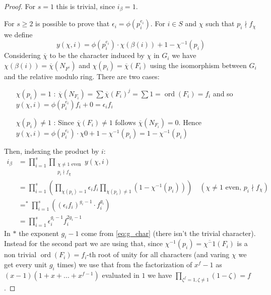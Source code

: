 \documentclass[]{article}
\theoremstyle{plain}
\theoremstyle{remark}
\theoremstyle{definition}
\DeclareMathOperator*{\eqb }{=}
\DeclareMathOperator{\ord}{ord}
\begin{document}
	\begin{proof}
		For $ s=1 $ this is trivial, since $ i_\beta = 1 $. 
		
		For $ s \geq 2 $ is possible to prove that $ \epsilon _i = \phi ( p_i ^ {e_i}) $. For $ i \in S$ and $ \chi $ such that $ p_i \nmid f_\chi $ we define
		 \[ y(\chi , i) = \phi(p_i^{e_i}) \cdot \chi (\beta (i))  + 1- \chi^{-1} (p_i) \]
		Considering $ \overline{\chi} $ to be the character induced by $ \chi $ in $ G_i$ we have $ \chi(\beta(i)) = \overline{\chi}(N_{F^i})  $ and $ \chi (p_i) = \overline{\chi}(F_i) $ using the isomorphism between $ G_i $ and the relative modulo ring. There are two cases: 
		\begin{itemize}
		\item[$ \chi(p_i) = 1 $ :] $ \overline{\chi}(N_{F_i}) = \sum \overline{\chi}(F_i)^j = \sum 1 = \ord (F_i) = f_i$  and so $ y(\chi , i) = \phi(p_i^{e_i})f_i + 0 = \epsilon _i f_i $
		\item[$ \chi(p_i) \neq 1 $ :] Since $ \overline{\chi}({F_i})  \neq 1 $ follows $ \overline{\chi}(N_{F_i}) = 0 $. %
		Hence $ y(\chi , i) = \phi(p_i^{e_i}) \cdot \chi 0  + 1- \chi^{-1} (p_i)= 1- \chi^{-1} (p_i) $
		\end{itemize}
		Then, indexing the product by $ i $:
		\begin{align*}
			i_\beta & = \prod_{i=1}^s	\prod_{ \substack{\chi \neq 1 \text{ even}\\ p_i \nmid f_\chi }} y(\chi ,i)				\\	
			& = \prod_{i=1}^s		\left( \prod_{ \chi(p_i) = 1  } \epsilon _i f_i \prod_{\chi(p_i) \neq 1}  (1- \chi^{-1} (p_i))\right) 	\quad (\chi \neq 1 \text{ even, } p_i\nmid f_\chi )		\\	
			& \eqb ^\ast  \prod_{i=1}^s	((\epsilon _i f_i )^{g_i - 1} \cdot f_i ^{g_i})				\\	
			 & = \prod_{i=1}^s		\epsilon _i^{g_i - 1} f_i ^{2 g_i - 1}		
		\end{align*}
		In $\ast$ the exponent $ g_i - 1 $ come from \ref{eq:g_char} (there isn't the trivial character). Instead for the second part we are using that, since $ \chi^{-1}(p_i) = \overline{\chi^-1}({F_i})  $ is a non trivial $ \ord(F_i)=f_i $-th root of unity for all characters (and varing $ \chi $ we get every unit $ g_i $ times) we use that from the factorization of $ x^f - 1  $ as $ (x - 1 )(1 + x + ... + x^{f-1}) $ evaluated in $ 1 $ we have $ \prod_{\zeta^f=1, \zeta\neq 1} (1- \zeta) = f $.
		
		
	\end{proof}
	
	
	\newpage
	\printbibliography
\end{document}
